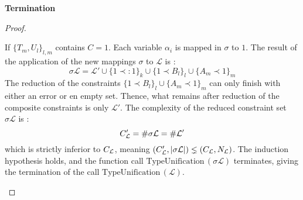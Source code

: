 \begin{thm}{\bf Termination}
\begin{proof}
\begin{itemize}
				If $\{T_m, U_l\}_{l, m}$ contains $C = 1$. Each variable $\alpha_i$ is mapped in $\sigma$ to $1$.
				The result of the application of the new mappings $\sigma$ to $\mathcal{L}$ is :
			  	$$\sigma \mathcal{L} = \mathcal{L'} \cup \{1 \prec: 1\}_k \cup \{ 1 \prec B_l \}_l \cup \{ A_m \prec 1 \}_m$$
       	The reduction of the constraints $\{ 1 \prec B_l \}_l \cup \{ A_m \prec 1 \}_m$ can only finish with either an error or en empty set.
       	Thence, what remains after reduction of the composite constraints is only $\mathcal{L'}$.
       	The complexity of the reduced constraint set $\sigma \mathcal{L}$ is :
			  	$$C_{\mathcal{L}}' = \#\sigma\mathcal{L} = \#\mathcal{L'} $$
			  which is strictly inferior to $C_{\mathcal{L}}$, meaning $(C_{\mathcal{L}}',|\sigma\mathcal{L}|) \lneq (C_{\mathcal{L}}, N_{\mathcal{L}})$.
			  The induction hypothesis holds, and the function call $\text{TypeUnification}\,(\sigma \mathcal{L})$ terminates,
			  giving the termination of the call $\text{TypeUnification}\,(\mathcal{L})$. \\
							

\end{itemize}
\end{proof}
\end{thm}
